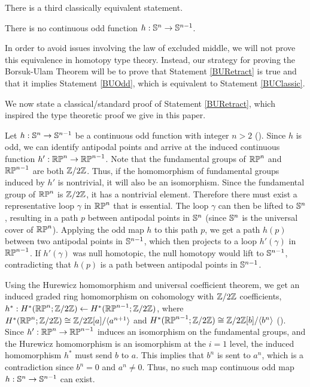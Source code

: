 \documentclass{amsart}
\begin{document}
There is a third classically equivalent statement.
\begin{statement}\label{BURetract}
There is no continuous odd function $h:\mathbb{S}^n \rightarrow \mathbb{S}^{n-1}$.
\end{statement}

In order to avoid issues involving the law of excluded middle, we will not prove this equivalence in homotopy type theory. Instead, our strategy for proving the Borsuk-Ulam Theorem will be to prove that Statement \ref{BURetract} is true and that it implies Statement \ref{BUOdd}, which is equivalent to Statement \ref{BUClassic}. 

We now state a classical/standard proof of Statement \ref{BURetract}, which inspired the type theoretic proof we give in this paper. 




 Let $h:\mathbb{S}^n \rightarrow \mathbb{S}^{n-1}$ be a continuous odd function with integer $n>2$ (). Since $h$ is odd, we can identify antipodal points and arrive at the induced continuous function $h':\mathbb{RP}^n\rightarrow\mathbb{RP}^{n-1}$. Note that the fundamental groups of $\mathbb{RP}^n$ and $\mathbb{RP}^{n-1}$ are both $\mathbb{Z}/2\mathbb{Z}$. 
 Thus, if the homomorphism of fundamental groups induced by $h'$ is nontrivial, it will also be an isomorphism.
 Since the fundamental group of $\mathbb{RP}^n$ is $\mathbb{Z}/2\mathbb{Z}$, it has a nontrivial element. Therefore there must exist a representative loop $\gamma$ in $\mathbb{RP}^n$ that is essential. The loop $\gamma$ can then be lifted to $\mathbb{S}^n$, resulting in a path $p$ between antipodal points in $\mathbb{S}^n$ (since $\mathbb{S}^n$ is the universal cover of $\mathbb{RP}^n$). Applying the odd map $h$ to this path $p$, we get a path $h(p)$ between two antipodal points in $\mathbb{S}^{n-1}$, which then projects to a loop $h'(\gamma)$ in $\mathbb{RP}^{n-1}$. If $h'(\gamma)$ was null homotopic, the null homotopy would lift to $\mathbb{S}^{n-1}$, contradicting that $h(p)$ is a path between antipodal points in $\mathbb{S}^{n-1}$. 
 
 
 
  Using the Hurewicz homomorphism and universal coefficient theorem, we get an induced graded ring homomorphism on cohomology with $\mathbb{Z}/2\mathbb{Z}$ coefficients, $h^*:H^*(\mathbb{RP}^n;\mathbb{Z}/2\mathbb{Z})\leftarrow H^*(\mathbb{RP}^{n-1};\mathbb{Z}/2\mathbb{Z})$, where $H^*(\mathbb{RP}^n;\mathbb{Z}/2\mathbb{Z})\cong \mathbb{Z}/2\mathbb{Z}[a]/\langle a^{n+1}\rangle$ and $H^*(\mathbb{RP}^{n-1};\mathbb{Z}/2\mathbb{Z})\cong \mathbb{Z}/2\mathbb{Z}[b]/\langle b^n\rangle$ ().  Since $h':\mathbb{RP}^n\rightarrow\mathbb{RP}^{n-1}$ induces an isomorphism on the fundamental groups, and the Hurewicz homomorphism is an isomorphism at the $i=1$ level, the induced homomorphism $h^*$ must send $b$ to $a$. This implies that $b^n$ is sent to $a^n$, which is a contradiction since $b^n=0$ and $a^n\neq 0$.  Thus, no such map continuous odd map $h:\mathbb{S}^n \rightarrow \mathbb{S}^{n-1}$ can exist.  
 
\end{document}
